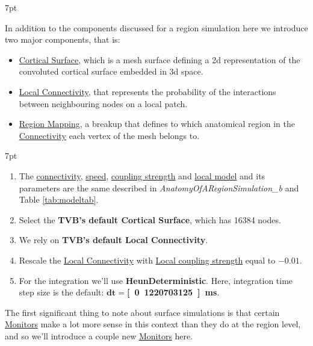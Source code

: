 \documentclass{tufte-handout}
\newenvironment{simulation}{%
  \def\FrameCommand{%
    \hspace{1pt}%
    {\color{ForestGreen}\vrule width 2pt}%
    {\color{simulationshade}\vrule width 4pt}%
    \colorbox{simulationshade}%
  }%
  \MakeFramed{\advance\hsize-\width\FrameRestore}%
  \noindent\hspace{-4.55pt}%
  \begin{adjustwidth}{}{7pt}%
  \vspace{2pt}\vspace{2pt}%
}
{%
  \vspace{2pt}\end{adjustwidth}\endMakeFramed%
}
\newenvironment{blah}{%
  \def\FrameCommand{%
    \hspace{1pt}%
    {\color{DarkOrange}\vrule width 2pt}%
    {\color{PeachPuff}\vrule width 4pt}%
    \colorbox{PeachPuff}%
  }%
  \MakeFramed{\advance\hsize-\width\FrameRestore}%
  \noindent\hspace{-4.55pt}%
  \begin{adjustwidth}{}{7pt}%
  \vspace{2pt}\vspace{2pt}%
}
{%
  \vspace{2pt}\end{adjustwidth}\endMakeFramed%
}
\begin{document}
\begin{blah}
In addition to the components discussed for a region simulation here we
introduce two major components, that is:

\begin{itemize}
\item \underline{Cortical Surface}, which is a mesh surface defining
a 2d representation of the convoluted cortical surface embedded in 3d space.
\item \underline{Local Connectivity}, that represents the probability of the interactions between neighbouring nodes on a local patch. 
\item \underline{Region Mapping},  a breakup that defines to which anatomical region in the \underline{Connectivity} each vertex of the mesh belongs to. 
\end{itemize}
\end{blah}

\begin{simulation}
\begin{enumerate}
\item The \underline{connectivity}, \underline{speed}, \underline{coupling strength} and \underline{local model} and its parameters are the same described in  \textit{AnatomyOfARegionSimulation\_b} and Table \ref{tab:modeltab}.
\item Select the \textbf{TVB's default Cortical Surface}, which has 16384 nodes. 
\item We rely on \textbf{TVB's default Local Connectivity}.
\item Rescale the \underline{Local Connectivity} with \underline{Local coupling strength} equal to $\mathbf{-0.01}$.
\item For the integration we'll use \textbf{HeunDeterministic}.  Here, integration time step size is the default: $\mathbf{dt=}$\textbf{\unit[0.1220703125]{ms}}.
\end{enumerate}
\end{simulation}

The first significant thing to note about surface simulations is that certain \underline{Monitors} make a lot more sense in this context than they do at the region level, and so we'll introduce a couple new \underline{Monitors} here.

\end{document}
